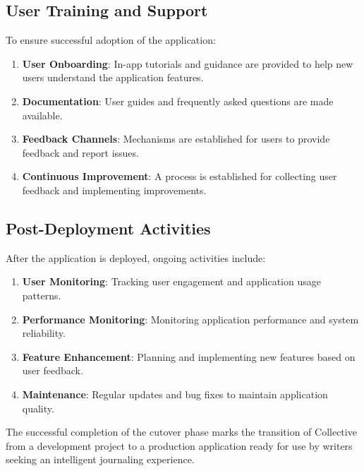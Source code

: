 \subsection{User Training and Support}\label{subsec:userSupport}

To ensure successful adoption of the application:

\begin{enumerate}
    \item \textbf{User Onboarding}: In-app tutorials and guidance are provided to help new users understand the application features.
    
    \item \textbf{Documentation}: User guides and frequently asked questions are made available.
    
    \item \textbf{Feedback Channels}: Mechanisms are established for users to provide feedback and report issues.
    
    \item \textbf{Continuous Improvement}: A process is established for collecting user feedback and implementing improvements.
\end{enumerate}

\subsection{Post-Deployment Activities}\label{subsec:postDeployment}

After the application is deployed, ongoing activities include:

\begin{enumerate}
    \item \textbf{User Monitoring}: Tracking user engagement and application usage patterns.
    
    \item \textbf{Performance Monitoring}: Monitoring application performance and system reliability.
    
    \item \textbf{Feature Enhancement}: Planning and implementing new features based on user feedback.
    
    \item \textbf{Maintenance}: Regular updates and bug fixes to maintain application quality.
\end{enumerate}

The successful completion of the cutover phase marks the transition of Collective from a development project to a production application ready for use by writers seeking an intelligent journaling experience.